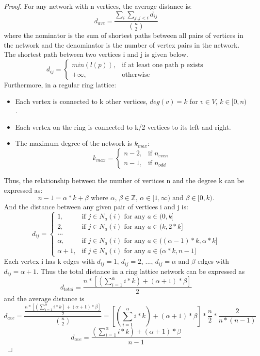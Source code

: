 \documentclass{article}
\begin{document}
\begin{proof}
For any network with n vertices, the average distance is:
\[
d_{ave} = \frac{\sum\limits_{i} \sum\limits_{j, j<i} d_{ij}}{\binom{n}{2}}
\]
where the nominator is the sum of shortest paths between all pairs of vertices in the network and the denominator is the number of vertex pairs in the network. The shortest path between two vertices i and j is given below.
\[
    d_{ij}= 
\begin{cases}
     min(l(p)),& \text{if at least one path p exists}\\
     +\infty,& \text{otherwise}
\end{cases}
\]
Furthermore, in a regular ring lattice:
\begin{itemize}
\item Each vertex is connected to k other vertices, $deg(v) = k$ for $v \in V$, $k \in [0, n)$.
\item Each vertex on the ring is connected to k/2 vertices to its left and right. 
\item The maximum degree of the network is $k_{max}$:
\[
    k_{max}= 
\begin{cases}
     n-2,& \text{if } n_{even}\\
     n-1,& \text{if } n_{odd}
\end{cases}
\]
\end{itemize}
Thus, the relationship between the number of vertices n and the degree k can be expressed as:
\[
n-1 = \alpha * k + \beta \text{ where } \alpha \text{, } \beta \in \mathbb{Z} \text{, } \alpha \in [1, \infty) \text{ and } \beta \in [0, k).
\]
And the distance between any given pair of vertices i and j is:
\[
    d_{ij}= 
\begin{cases}
     1,& \text{if } j \in {N_{a}(i) \text{ for any } a \in (0, k]}\\
     2,& \text{if } j \in {N_{a}(i) \text{ for any } a \in (k, 2*k]}\\
     ...\\
     \alpha,& \text{if } j \in {N_{a}(i) \text{ for any } a \in ((\alpha-1)*k, \alpha*k]}\\
     \alpha+1,& \text{if } j \in {N_{a}(i) \text{ for any } a \in (\alpha*k, n-1]}
\end{cases}
\]
Each vertex i has k edges with $d_{ij}=1$, $d_{ij}=2$, ..., $d_{ij}=\alpha$ and $\beta$ edges with $d_{ij}=\alpha+1$. Thus the total distance in a ring lattice network can be expressed as
\[
    d_{total}= \frac{n*[(\sum\limits_{i=1}^\alpha i*k) + (\alpha + 1) * \beta]}{2}
\]
and the average distance is
\[
d_{ave} = \frac{\frac{n*[(\sum\limits_{i=1}^\alpha i*k) + (\alpha + 1) * \beta]}{2}}{\binom{n}{2}} = [(\sum\limits_{i=1}^\alpha i*k) + (\alpha + 1) * \beta] * \frac{n}{2} * \frac{2}{n * (n-1)}
\]
\[
d_{ave} = \frac{(\sum\limits_{i=1}^\alpha i*k) + (\alpha + 1) * \beta}{n-1}
\]
\end{proof}

\nocite{*}


\end{document}
